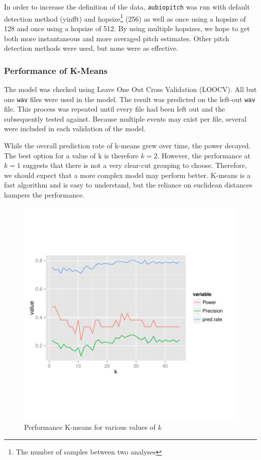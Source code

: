 \documentclass[paper=a4, fontsize=11pt]{scrartcl}
\numberwithin{equation}{section}
\numberwithin{figure}{section}
\numberwithin{table}{section}
\begin{document}
In order to increase the definition of the data, \texttt{aubiopitch} was run with default detection method (yinfft) and hopsize\footnote{The number of samples between two analyses} (256) as well as once using a hopsize of 128 and once using a hopsize of 512. By using multiple hopsizes, we hope to get both more instantaneous and more averaged pitch estimates. Other pitch detection methods were used, but none were as effective.

\subsubsection{Performance of K-Means}\label{subsubsec:LOOCV}
The model was checked using Leave One Out Cross Validation (LOOCV). All but one \texttt{wav} files were used in the model. The result was predicted on the left-out \texttt{wav} file. This process was repeated until every file had been left out and the subsequently tested against. Because multiple events may exist per file, several were included in each validation of the model.

While the overall prediction rate of k-means grew over time, the power decayed. The best option for a value of k is therefore $k=2$. However, the performance at $k=1$ suggests that there is not a very clear-cut grouping to choose. Therefore, we should expect that a more complex model may perform better. K-means is a fast algorithm and is easy to understand, but the reliance on euclidean distances hampers the performance.

\begin{figure}[H]
\begin{center}
\vspace{-100pt}
\includegraphics[width=\textwidth]{k_means.pdf}
\vspace{-120pt}
\caption{Performance K-means for various values of $k$}
\end{center}
\end{figure}
\end{document}
